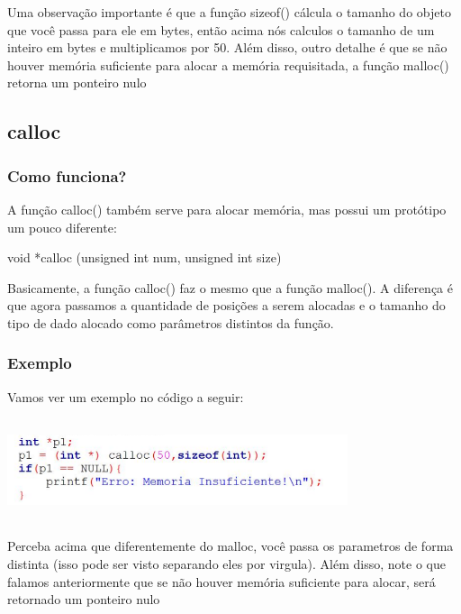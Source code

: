 \documentclass{report}
\begin{document}
	Uma observação importante é que a função sizeof() cálcula o tamanho do objeto que você passa para ele em bytes, então acima nós calculos o tamanho de um inteiro em bytes e multiplicamos por 50. Além disso, outro detalhe é que se não houver memória suficiente para alocar a memória requisitada,  a função malloc() retorna um ponteiro nulo
	
	\subsection{calloc}
	
	\subsubsection{Como funciona?}
	
	A função calloc() também serve para alocar memória, mas possui um protótipo um pouco
	diferente:
	
	\begin{center}
		\begin{LARGE}
			void *calloc (unsigned int num, unsigned int size)
		\end{LARGE}
	\end{center}
	
	Basicamente, a função calloc() faz o mesmo que a função malloc(). A diferença é que agora
	passamos a quantidade de posições a serem alocadas e o tamanho do tipo de dado alocado
	como parâmetros distintos da função.
	
	\subsubsection{Exemplo}
	
	Vamos ver um exemplo no código a seguir:
	
	\begin{center}
		
		\includegraphics[width=10cm,height=3cm,keepaspectratio=false]{imagens/calloc.png}
		
	\end{center}
	
	Perceba acima que diferentemente do malloc, você passa os parametros de forma distinta (isso pode ser visto separando eles por virgula). Além disso, note o que falamos anteriormente que se não houver memória suficiente para alocar, será retornado um ponteiro nulo
	
\end{document}
